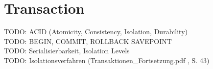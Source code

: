 \section{Transaction}
TODO: ACID (Atomicity, Consistency, Isolation, Durability) \\
TODO: BEGIN, COMMIT, ROLLBACK SAVEPOINT \\
TODO: Serialisierbarkeit, Isolation Levels \\
TODO: Isolationsverfahren (Transaktionen\_Fortsetzung.pdf , S. 43)